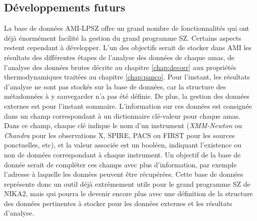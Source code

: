 \subsection{Développements futurs}

La base de données AMI-LPSZ offre un grand nombre de fonctionnalités qui ont déjà énormément facilité la gestion du grand programme SZ.
Certains aspects restent cependant à développer.
L'un des objectifs serait de stocker dans AMI les résultats des différentes étapes de l'analyse des données de chaque amas, de l'analyse des données brutes décrite au chapitre \ref{chap:decorr} aux propriétés thermodynamiques traitées au chapitre \ref{chap:panco}.
Pour l'instant, les résultats d'analyse ne sont pas stockés sur la base de données, car la structure des métadonnées à y sauvegarder n'a pas été définie.
De plus, la gestion des données externes est pour l'instant sommaire.
L'information sur ces données est consignée dans un champ correspondant à un dictionnaire clé-valeur pour chaque amas.
Dans ce champ, chaque clé indique le nom d'un instrument (\textit{XMM-Newton} ou \textit{Chandra} pour les observations X, SPIRE, PACS ou FIRST pour les sources ponctuelles, etc), et la valeur associée est un booléen, indiquant l'existence ou non de données correspondant à chaque instrument.
Un objectif de la base de donnée serait de compléter ces champs avec plus d'information, par exemple l'adresse à laquelle les données peuvent être récupérées.
Cette base de données représente donc un outil déjà extrêmement utile pour le grand programme SZ de NIKA2, mais qui pourra le devenir encore plus avec une définition de la structure des données pertinentes à stocker pour les données externes et les résultats d'analyse.

